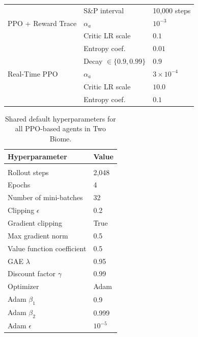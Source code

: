 \begin{table}[H]
\begin{center}
\begin{tabular}{lll}
                                 & S\&P interval   & 10{,}000 steps \\[4pt]
            PPO + Reward Trace   & $\alpha_a$      & $10^{-3}$ \\
                                 & Critic LR scale & $0.1$ \\
                                 & Entropy coef.   & $0.01$ \\
                                 & Decay $\in \{0.9, 0.99\}$   & $0.9$ \\[4pt]
            Real-Time PPO        & $\alpha_a$      & $3 \times 10^{-4}$ \\
                                 & Critic LR scale & $10.0$ \\
                                 & Entropy coef.   & $0.1$ \\
        \end{tabular}
    \end{center}
    \label{tab:ppo_swept_hypers}
\end{table}

\begin{table}[H]
    \caption{Shared default hyperparameters for all PPO-based agents in Two Biome.}
    \begin{center}
        \begin{tabular}{ll}
            \multicolumn{1}{l}{\bf Hyperparameter} & \multicolumn{1}{l}{\bf Value}
            \\ \hline \\
            Rollout steps                & 2{,}048 \\
            Epochs                       & 4 \\
            Number of mini-batches       & 32 \\
            Clipping $\epsilon$          & 0.2 \\
            Gradient clipping            & True \\
            Max gradient norm            & 0.5 \\
            Value function coefficient   & 0.5 \\
            GAE $\lambda$                & 0.95 \\
            Discount factor $\gamma$     & 0.99 \\
            Optimizer                    & Adam \\
            Adam $\beta_1$               & 0.9 \\
            Adam $\beta_2$               & 0.999 \\
            Adam $\epsilon$              & $10^{-5}$ \\
        \end{tabular}
    \end{center}
    \label{tab:ppo_defaults}
\end{table}
